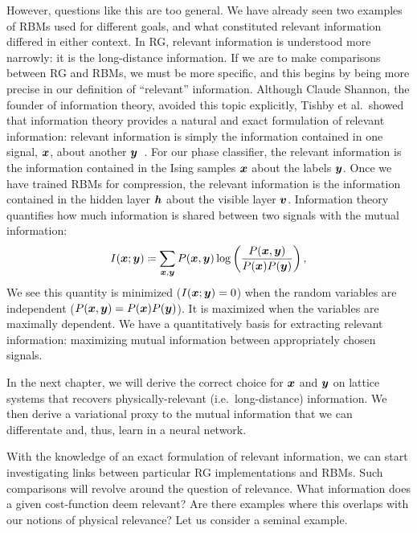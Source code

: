 However, questions like this are too general. We have already seen two
examples of RBMs used for different goals, and what constituted relevant
information differed in either context. In RG, relevant information is
understood more narrowly: it is the long-distance information. If we
are to make comparisons between RG and RBMs, we must be more specific,
and this begins by being more precise in our definition of
``relevant'' information. Although Claude Shannon, the founder of
information theory, avoided this topic explicitly, Tishby et al.\
showed that information theory provides a natural and exact
formulation of relevant information: relevant information is simply
the information contained in one signal, $\boldsymbol{x}$, about another
$\boldsymbol{y}$~\cite{tishby}. For our phase classifier, the relevant
information is the information contained in the Ising samples $\boldsymbol{x}$
about the labels $\boldsymbol{y}$. Once we have trained RBMs for compression, the
relevant information is the information contained in the hidden layer
$\boldsymbol{h}$ about the visible layer $\boldsymbol{v}$. Information theory quantifies how
much information is shared between two signals with the mutual
information:
\begin{equation}%
  I(\bx; \by)\eqcolon\sum_{\bx,\by}P(\bx,\by)\log\left(\frac{P(\bx,\by)}{P(\bx)P(\by)}\right),\label{eq:mutual-info}
\end{equation}%
We see this quantity is minimized ($I(\boldsymbol{x};\boldsymbol{y})=0$) when the random
variables are independent ($P(\boldsymbol{x},\boldsymbol{y})=P(\boldsymbol{x})P(\boldsymbol{y})$). It is maximized
when the variables are maximally dependent. We have a quantitatively
basis for extracting relevant information: maximizing mutual
information between appropriately chosen signals.

In the next chapter, we will derive the correct choice for $\boldsymbol{x}$ and
$\boldsymbol{y}$ on lattice systems that recovers physically-relevant (i.e.\
long-distance) information. We then derive a variational proxy to the
mutual information that we can differentate and, thus, learn in a
neural network.

With the knowledge of an exact formulation of relevant information, we
can start investigating links between particular RG implementations
and RBMs. Such comparisons will revolve around the question of
relevance. What information does a given cost-function deem relevant?
Are there examples where this overlaps with our notions of physical
relevance? Let us consider a seminal example.

